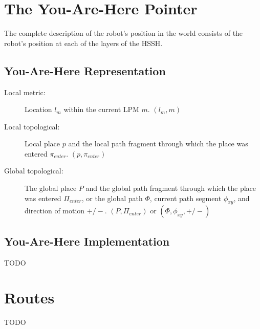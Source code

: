 \documentclass{article}
\begin{document}
\section{The You-Are-Here Pointer}
The complete description of the robot's position in the world consists of the robot's position at each of the layers of
the HSSH.

\subsection{You-Are-Here Representation}
\begin{description}
    \item[Local metric:] Location $l_m$ within the current LPM $m$.  $(l_m, m)$
    
    \item[Local topological:] Local place $p$ and the local path fragment through which the place was entered
    $\pi_{enter}$. $(p, \pi_{enter})$
    
    \item[Global topological:] The global place $P$ and the global path fragment through which the place was entered
    $\Pi_{enter}$, or the global path $\Phi$, current path segment $\phi_{xy}$, and direction of motion $+/-$. $(P,
    \Pi_{enter})$ or $(\Phi, \phi_{xy}, +/-)$
\end{description}

\subsection{You-Are-Here Implementation}
TODO

\section{Routes}
TODO
\end{document}
